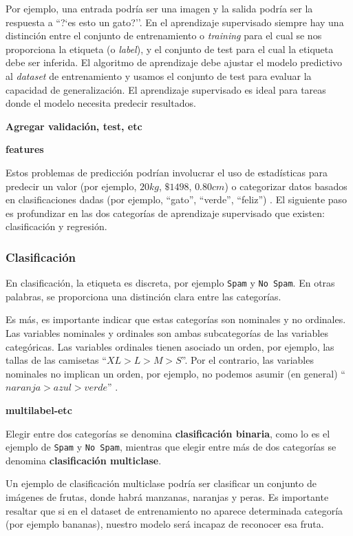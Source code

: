 \documentclass[a4paper,12pt]{article}
\begin{document}
Por ejemplo, una entrada podría ser una imagen y la salida podría ser la respuesta a ``?`es esto un gato?''. En el aprendizaje supervisado siempre hay una distinción entre el conjunto de entrenamiento o \textit{training} para el cual se nos proporciona la etiqueta (o \textit{label}), y el conjunto de test para el cual la etiqueta debe ser inferida. El algoritmo de aprendizaje debe ajustar el modelo predictivo al \textit{dataset} de entrenamiento y usamos el conjunto de test para evaluar la capacidad de generalización. El aprendizaje supervisado es ideal para tareas donde el modelo necesita predecir resultados. 

\textbf{Agregar validación, test, etc}

\textbf{features}

Estos problemas de predicción podrían involucrar el uso de estadísticas para predecir un valor (por ejemplo, $20 kg$, $\$1498$, $0.80 cm$) o categorizar datos basados en clasificaciones dadas (por ejemplo, ``gato'', ``verde'', ``feliz'') \cite{norman2019aprendizaje}.  El siguiente paso es profundizar en las dos categorías de aprendizaje supervisado que existen: clasificación y regresión.

\subsubsection{Clasificación}

En clasificación, la etiqueta es discreta, por ejemplo \texttt{Spam} y \texttt{No Spam}. En otras palabras, se proporciona una distinción clara entre las categorías. 

Es más, es importante indicar que estas categorías son nominales y no ordinales. Las variables nominales y ordinales son ambas subcategorías de las variables categóricas. Las variables ordinales tienen asociado un orden, por ejemplo, las tallas de las camisetas ``$XL > L > M > S$''. Por el contrario, las variables nominales no implican un orden, por ejemplo, no podemos asumir (en general) ``$naranja > azul > verde$'' \cite{GitHubpa25:online}.

\textbf{multilabel-etc}

Elegir entre dos categorías se denomina \textbf{clasificación binaria}, como lo es el ejemplo de \texttt{Spam} y \texttt{No Spam}, mientras que elegir entre más de dos categorías se denomina \textbf{clasificación multiclase}. 

Un ejemplo de clasificación multiclase podría ser clasificar un conjunto de imágenes de frutas, donde habrá manzanas, naranjas y peras. Es importante resaltar que si en el dataset de entrenamiento no aparece determinada categoría (por ejemplo bananas), nuestro modelo será incapaz de reconocer esa fruta.
\end{document}
